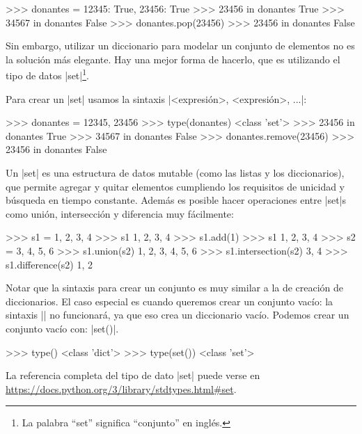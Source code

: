\begin{subappendices}
\begin{codigo-python-sn}
>>> donantes = {12345: True, 23456: True}
>>> 23456 in donantes
True
>>> 34567 in donantes
False
>>> donantes.pop(23456)
>>> 23456 in donantes
False
\end{codigo-python-sn}

Sin embargo, utilizar un diccionario para modelar un conjunto de elementos no
es la solución más elegante. Hay una mejor forma de hacerlo, que es
utilizando el tipo de datos |set|\footnote{La palabra ``set'' significa
``conjunto'' en inglés.}.

Para crear un |set| usamos la sintaxis |{<expresión>, <expresión>, ...}|:

\begin{codigo-python-sn}
>>> donantes = {12345, 23456}
>>> type(donantes)
<class 'set'>
>>> 23456 in donantes
True
>>> 34567 in donantes
False
>>> donantes.remove(23456)
>>> 23456 in donantes
False
\end{codigo-python-sn}

Un |set| es una estructura de datos mutable (como las listas y los
diccionarios), que permite agregar y quitar elementos cumpliendo los requisitos de
unicidad y búsqueda en tiempo constante. Además es posible hacer operaciones
entre |set|s como unión, intersección y diferencia muy fácilmente:

\begin{codigo-python-sn}
>>> s1 = {1, 2, 3, 4}
>>> s1
{1, 2, 3, 4}
>>> s1.add(1)
>>> s1
{1, 2, 3, 4}
>>> s2 = {3, 4, 5, 6}
>>> s1.union(s2)
{1, 2, 3, 4, 5, 6}
>>> s1.intersection(s2)
{3, 4}
>>> s1.difference(s2)
{1, 2}
\end{codigo-python-sn}

Notar que la sintaxis para crear un conjunto es muy similar a la de creación de
diccionarios. El caso especial es cuando queremos crear un conjunto vacío: la
sintaxis |{}| no funcionará, ya que eso crea un diccionario vacío. Podemos
crear un conjunto vacío con: |set()|.

\begin{codigo-python-sn}
>>> type({})
<class 'dict'>
>>> type(set())
<class 'set'>
\end{codigo-python-sn}

La referencia completa del tipo de dato |set| puede verse en
\url{https://docs.python.org/3/library/stdtypes.html#set}.
\end{subappendices}
